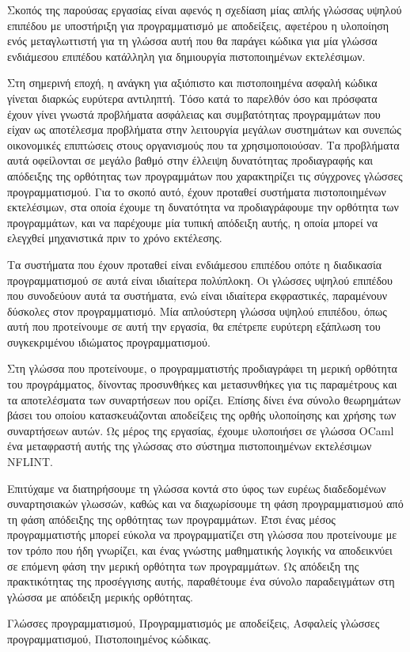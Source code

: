 \documentclass[diploma]{softlab-thesis}
\begin{document}
\begin{abstractgr}%
  Σκοπός της παρούσας εργασίας είναι αφενός η σχεδίαση μίας απλής
  γλώσσας υψηλού επιπέδου με υποστήριξη για προγραμματισμό με
  αποδείξεις, αφετέρου η υλοποίηση ενός μεταγλωττιστή για τη γλώσσα
  αυτή που θα παράγει κώδικα για μία γλώσσα ενδιάμεσου επιπέδου
  κατάλληλη για δημιουργία πιστοποιημένων εκτελέσιμων.

  Στη σημερινή εποχή, η ανάγκη για αξιόπιστο και πιστοποιημένα ασφαλή
  κώδικα γίνεται διαρκώς ευρύτερα αντιληπτή. Τόσο κατά το παρελθόν όσο
  και πρόσφατα έχουν γίνει γνωστά προβλήματα ασφάλειας και
  συμβατότητας προγραμμάτων που είχαν ως αποτέλεσμα προβλήματα στην
  λειτουργία μεγάλων συστημάτων και συνεπώς οικονομικές επιπτώσεις
  στους οργανισμούς που τα χρησιμοποιούσαν. Τα προβλήματα αυτά
  οφείλονται σε μεγάλο βαθμό στην έλλειψη δυνατότητας προδιαγραφής και
  απόδειξης της ορθότητας των προγραμμάτων που χαρακτηρίζει τις
  σύγχρονες γλώσσες προγραμματισμού. Για το σκοπό αυτό, έχουν προταθεί
  συστήματα πιστοποιημένων εκτελέσιμων, στα οποία έχουμε τη δυνατότητα
  να προδιαγράφουμε την ορθότητα των προγραμμάτων, και να παρέχουμε
  μία τυπική απόδειξη αυτής, η οποία μπορεί να ελεγχθεί μηχανιστικά
  πριν το χρόνο εκτέλεσης.

  Τα συστήματα που έχουν προταθεί είναι ενδιάμεσου επιπέδου οπότε η
  διαδικασία προγραμματισμού σε αυτά είναι ιδιαίτερα πολύπλοκη. Οι
  γλώσσες υψηλού επιπέδου που συνοδεύουν αυτά τα συστήματα, ενώ είναι
  ιδιαίτερα εκφραστικές, παραμένουν δύσκολες στον προγραμματισμό.  Μία
  απλούστερη γλώσσα υψηλού επιπέδου, όπως αυτή που προτείνουμε σε αυτή
  την εργασία, θα επέτρεπε ευρύτερη εξάπλωση του συγκεκριμένου
  ιδιώματος προγραμματισμού.

  Στη γλώσσα που προτείνουμε, ο προγραμματιστής προδιαγράφει τη μερική
  ορθότητα του προγράμματος, δίνοντας προσυνθήκες και μετασυνθήκες για
  τις παραμέτρους και τα αποτελέσματα των συναρτήσεων που ορίζει.
  Επίσης δίνει ένα σύνολο θεωρημάτων βάσει του οποίου κατασκευάζονται
  αποδείξεις της ορθής υλοποίησης και χρήσης των συναρτήσεων αυτών. Ως
  μέρος της εργασίας, έχουμε υλοποιήσει σε γλώσσα OCaml ένα
  μεταφραστή αυτής της γλώσσας στο σύστημα πιστοποιημένων
  εκτελέσιμων NFLINT.

  Επιτύχαμε να διατηρήσουμε τη γλώσσα κοντά στο ύφος των ευρέως
  διαδεδομένων συναρτησιακών γλωσσών, καθώς και να διαχωρίσουμε τη
  φάση προγραμματισμού από τη φάση απόδειξης της ορθότητας των
  προγραμμάτων. Έτσι ένας μέσος προγραμματιστής μπορεί εύκολα να
  προγραμματίζει στη γλώσσα που προτείνουμε με τον τρόπο που ήδη
  γνωρίζει, και ένας γνώστης μαθηματικής λογικής να αποδεικνύει σε
  επόμενη φάση την μερική ορθότητα των προγραμμάτων. Ως απόδειξη της
  πρακτικότητας της προσέγγισης αυτής, παραθέτουμε ένα σύνολο
  παραδειγμάτων στη γλώσσα με απόδειξη μερικής ορθότητας.
\begin{keywordsgr}
  Γλώσσες προγραμματισμού,
  Προγραμματισμός με αποδείξεις,
  Ασφαλείς γλώσσες προγραμματισμού,
  Πιστοποιημένος κώδικας.
\end{keywordsgr}
\end{abstractgr}
\end{document}
